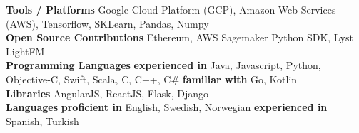

\begin{cvparagraph}

\textbf{Tools / Platforms}
Google Cloud Platform (GCP), Amazon Web Services (AWS), Tensorflow, SKLearn,
Pandas, Numpy
\\
\textbf{Open Source Contributions}
Ethereum,
AWS Sagemaker Python SDK, Lyst LightFM
\\
\textbf{Programming Languages}
\textbf{experienced in}
Java, Javascript, Python, Objective-C, Swift, Scala, C, C++, C\#
\textbf{familiar with}
Go, Kotlin
\\
\textbf{Libraries}
AngularJS, ReactJS, Flask, Django
\\
\textbf{Languages}
\textbf{proficient in}
English, Swedish, Norwegian
\textbf{experienced in}
Spanish, Turkish

\end{cvparagraph}
